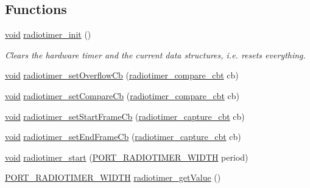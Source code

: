 \subsection*{Functions}
\begin{DoxyCompactItemize}
\item 
\hyperlink{usb__devapi_8h_afabf60e7f57651d6d595a02c75f07cd0}{void} \hyperlink{group__radiotimer_ga9a5ab332f81d5e2a74143ad62ef6a2f7}{radiotimer\+\_\+init} ()
\begin{DoxyCompactList}\small\item\em Clears the hardware timer and the current data structures, i.\+e. resets everything. \end{DoxyCompactList}\item 
\hyperlink{usb__devapi_8h_afabf60e7f57651d6d595a02c75f07cd0}{void} \hyperlink{group__radiotimer_gab892e556a83f22551ff4e4551bd488f7}{radiotimer\+\_\+set\+Overflow\+Cb} (\hyperlink{group__radiotimer_ga62b602325e65023c91b784f20cd2d6bc}{radiotimer\+\_\+compare\+\_\+cbt} cb)
\item 
\hyperlink{usb__devapi_8h_afabf60e7f57651d6d595a02c75f07cd0}{void} \hyperlink{group__radiotimer_gaf4d7c5df5b6c28462c5104df496ae584}{radiotimer\+\_\+set\+Compare\+Cb} (\hyperlink{group__radiotimer_ga62b602325e65023c91b784f20cd2d6bc}{radiotimer\+\_\+compare\+\_\+cbt} cb)
\item 
\hyperlink{usb__devapi_8h_afabf60e7f57651d6d595a02c75f07cd0}{void} \hyperlink{group__radiotimer_gad6bae4a356aa6856a48dd247eea43f84}{radiotimer\+\_\+set\+Start\+Frame\+Cb} (\hyperlink{group__radiotimer_gac7da641d0774aa21bfabefd560e42acf}{radiotimer\+\_\+capture\+\_\+cbt} cb)
\item 
\hyperlink{usb__devapi_8h_afabf60e7f57651d6d595a02c75f07cd0}{void} \hyperlink{group__radiotimer_ga54531cf0f173f07f760d24aeacbc6fe3}{radiotimer\+\_\+set\+End\+Frame\+Cb} (\hyperlink{group__radiotimer_gac7da641d0774aa21bfabefd560e42acf}{radiotimer\+\_\+capture\+\_\+cbt} cb)
\item 
\hyperlink{usb__devapi_8h_afabf60e7f57651d6d595a02c75f07cd0}{void} \hyperlink{group__radiotimer_ga5afd5ed18d32fb118dca4ea99d181e35}{radiotimer\+\_\+start} (\hyperlink{z1_2board__info_8h_ac16e02aadd749b2d27638bed1a805a59}{P\+O\+R\+T\+\_\+\+R\+A\+D\+I\+O\+T\+I\+M\+E\+R\+\_\+\+W\+I\+D\+TH} period)
\item 
\hyperlink{z1_2board__info_8h_ac16e02aadd749b2d27638bed1a805a59}{P\+O\+R\+T\+\_\+\+R\+A\+D\+I\+O\+T\+I\+M\+E\+R\+\_\+\+W\+I\+D\+TH} \hyperlink{group__radiotimer_ga763b0da72c3bbf926f5a74283de1003c}{radiotimer\+\_\+get\+Value} ()

\end{DoxyCompactItemize}
